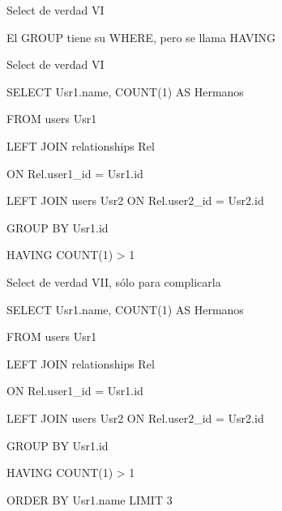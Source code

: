 \documentclass{beamer}
\begin{document}
\begin{frame}{Select de verdad VI}
	\begin{center}
		El GROUP tiene su WHERE, pero se llama HAVING
	\end{center}
\end{frame}

\begin{frame}{Select de verdad VI}
\begin{semiverbatim}SELECT Usr1.name, COUNT(1) AS Hermanos \end{semiverbatim}
\begin{semiverbatim}FROM users Usr1\end{semiverbatim}
\begin{semiverbatim}LEFT JOIN relationships Rel\end{semiverbatim}
\begin{semiverbatim}ON Rel.user1\_id = Usr1.id\end{semiverbatim}
\begin{semiverbatim}LEFT JOIN users Usr2 ON Rel.user2\_id = Usr2.id\end{semiverbatim}
\begin{semiverbatim}GROUP BY Usr1.id\end{semiverbatim}
\begin{semiverbatim}\alert{HAVING COUNT(1) > 1}\end{semiverbatim}
\end{frame}

\begin{frame}{Select de verdad VII, s\'olo para complicarla}
\begin{semiverbatim}SELECT Usr1.name, COUNT(1) AS Hermanos \end{semiverbatim}
\begin{semiverbatim}FROM users Usr1\end{semiverbatim}
\begin{semiverbatim}LEFT JOIN relationships Rel\end{semiverbatim}
\begin{semiverbatim}ON Rel.user1\_id = Usr1.id\end{semiverbatim}
\begin{semiverbatim}LEFT JOIN users Usr2 ON Rel.user2\_id = Usr2.id\end{semiverbatim}
\begin{semiverbatim}GROUP BY Usr1.id\end{semiverbatim}
\begin{semiverbatim}HAVING COUNT(1) > 1\end{semiverbatim}
\begin{semiverbatim}\alert{ORDER BY Usr1.name LIMIT 3}\end{semiverbatim}
\end{frame}
\end{document}
